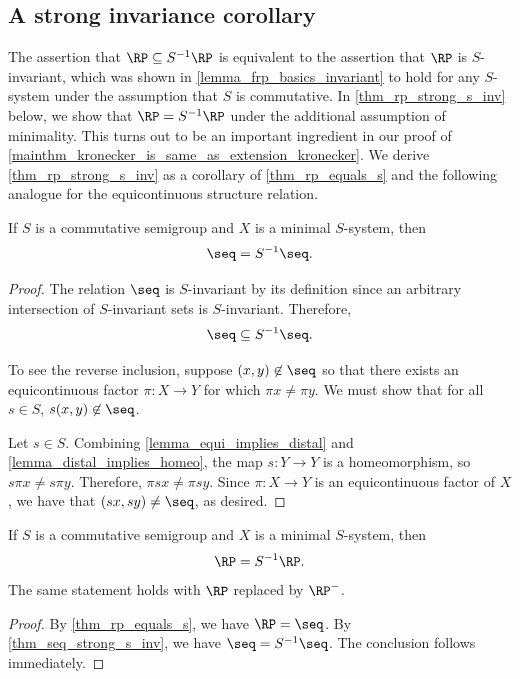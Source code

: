 \subsection{A strong invariance corollary}

The assertion that $\RP \subseteq S^{-1} \RP$
is equivalent to the assertion that $\RP$ is $S$-invariant, which was shown in \cref{lemma_frp_basics_invariant} to hold for any $S$-system under the assumption that $S$ is commutative.  In \cref{thm_rp_strong_s_inv} below, we show that $\RP = S^{-1} \RP$ under the additional assumption of minimality.  This turns out to be an important ingredient in our proof of \cref{mainthm_kronecker_is_same_as_extension_kronecker}.  We derive \cref{thm_rp_strong_s_inv} as a corollary of \cref{thm_rp_equals_s} and the following analogue for the equicontinuous structure relation.  

\begin{lemma}
\label{thm_seq_strong_s_inv}
\leanok{}
    If $S$ is a commutative semigroup and $X$ is a minimal $S$-system, then
    \[\seq = S^{-1} \seq.\]
\end{lemma}

\begin{proof}
    The relation $\seq$ is $S$-invariant by its definition since an arbitrary intersection of $S$-invariant sets is $S$-invariant.  Therefore,
    \[\seq \subseteq S^{-1}\seq.\]
    
    To see the reverse inclusion, suppose $(x,y) \not\in \seq$ so that there exists an equicontinuous factor $\pi: X \to Y$ for which $\pi x \neq \pi y$.  We must show that for all $s \in S$, $s(x,y) \not\in \seq$.
    
    Let $s \in S$. Combining \cref{lemma_equi_implies_distal} and \cref{lemma_distal_implies_homeo}, the map $s: Y \to Y$ is a homeomorphism, so $s \pi x \neq s \pi y$.  Therefore, $\pi s x \neq \pi s y$.  Since $\pi: X \to Y$ is an equicontinuous factor of $X$, we have that $(sx, sy) \neq \seq$, as desired. 
\end{proof}

\begin{theorem}
\label{thm_rp_strong_s_inv}
\leanok{}
    If $S$ is a commutative semigroup and $X$ is a minimal $S$-system, then
    \[\RP = S^{-1} \RP.\]
    The same statement holds with $\RP$ replaced by $\RP^-$.
\end{theorem}

\begin{proof}
    By \cref{thm_rp_equals_s}, we have $\RP = \seq$. By \cref{thm_seq_strong_s_inv}, we have $\seq = S^{-1} \seq$. The conclusion follows immediately.
\end{proof}


